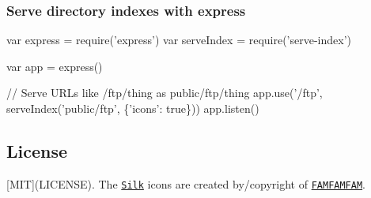 \subsubsection*{Serve directory indexes with express}


\begin{DoxyCode}
var express    = require('express')
var serveIndex = require('serve-index')

var app = express()

// Serve URLs like /ftp/thing as public/ftp/thing
app.use('/ftp', serveIndex('public/ftp', \{'icons': true\}))
app.listen()
\end{DoxyCode}


\subsection*{License}

\mbox{[}M\+IT\mbox{]}(L\+I\+C\+E\+N\+SE). The \href{http://www.famfamfam.com/lab/icons/silk/}{\tt Silk} icons are created by/copyright of \href{http://www.famfamfam.com/}{\tt F\+A\+M\+F\+A\+M\+F\+AM}. 